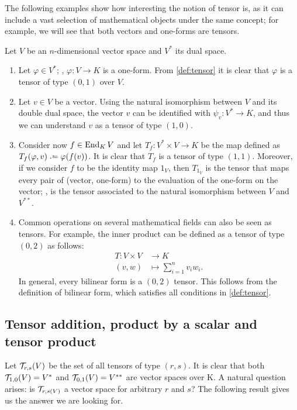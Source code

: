 \begin{example}
	\label{ex:tensors}
	The following examples show how interesting the notion of tensor is, as it can include a vast selection of mathematical objects under the same concept; for example, we will see that both vectors and one-forms are tensors.

	Let $V$ be an $n$-dimensional vector space and $V^*$ its dual space.
	\begin{enumerate}
		\item Let $\varphi \in V^*$; \ie,  $\varphi \colon V \to K$ is a one-form. From \autoref{def:tensor} it is clear that $\varphi$ is a tensor of type $(0,1)$ over $V$.
		\item Let $v \in V$ be a vector. Using the natural isomorphism between $V$ and its double dual space, the vector $v$ can be identified with $\psi_v \colon V^* \to K$, and thus we can understand $v$ as a tensor of type $(1,0)$.
		\item Consider now $f \in \operatorname{End}_K V$ and let $T_f \colon V^* \times V \to K$ be the map defined as $T_f(\varphi, v) \defeq \varphi(f(v))$. It is clear that $T_f$ is a tensor of type $(1,1)$. Moreover, if we consider $f$ to be the identity map $1_V$, then $T_{1_V}$ is the tensor that maps every pair of (vector, one-form) to the evaluation of the one-form on the vector; \ie, is the tensor associated to the natural isomorphism between $V$ and $V^{**}$.
		\item Common operations on several mathematical fields can also be seen as tensors. For example, the inner product can be defined as a tensor of type $(0,2)$ as follows:
		\begin{align*}
			T \colon V \times V &\to K\\
			(v,w) &\mapsto \sum_{i=1}^n v_i w_i.
		\end{align*}
		In general, every bilinear form is a $(0,2)$ tensor. This follows from the definition of bilinear form, which satisfies all conditions in \autoref{def:tensor}.
	\end{enumerate}
\end{example}

\subsection{Tensor addition, product by a scalar and tensor product}
Let ${\mathcal T}_{r,s}(V)$ be the set of all tensors of type $(r,s)$. It is clear that both ${\mathcal T}_{1,0}(V) = V^*$ and ${\mathcal T}_{0,1}(V) = V^{**}$ are vector spaces over K. A natural question arises: is ${\mathcal T}_{r,s(V)}$ a vector space for arbitrary $r$ and $s$? The following result gives us the answer we are looking for.

